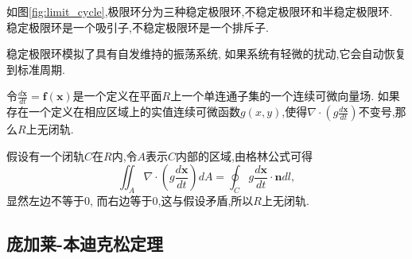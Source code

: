 如图\ref{fig:limit_cycle},极限环分为三种稳定极限环,不稳定极限环和半稳定极限环. 稳定极限环是一个吸引子,不稳定极限环是一个排斥子. 

稳定极限环模拟了具有自发维持的振荡系统, 如果系统有轻微的扰动,它会自动恢复到标准周期. 

\begin{thm}[Dulac准则]\cite{strogatz2018nonlinear}
    令$\frac{d\mathbf{x}}{dt}=\mathbf{f}(\mathbf{x})$是一个定义在平面$R$上一个单连通子集的一个连续可微向量场. 如果存在一个定义在相应区域上的实值连续可微函数$g(x, y)$,使得$\nabla \cdot (g \frac{d\mathbf{x}}{dt})$不变号,那么$R$上无闭轨. 
\end{thm}
\begin{pf}
    假设有一个闭轨$C$在$R$内,令$A$表示$C$内部的区域,由格林公式可得
    \begin{equation}
        \iint_A \nabla \cdot(g \frac{d\mathbf{x}}{dt})dA=\oint_C g \frac{d\mathbf{x}}{dt}\cdot \mathbf{n}dl,
    \end{equation}
    显然左边不等于0, 而右边等于0,这与假设矛盾,所以$R$上无闭轨. 
\end{pf}

\subsection{庞加莱-本迪克松定理}

